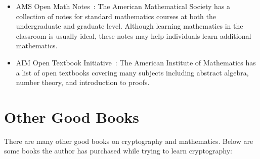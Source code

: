 \begin{itemize}
\item AMS Open Math Notes~\cite{AMSOpenMathNotes}:
    The American Mathematical Society has a collection of notes
    for standard mathematics courses at both the undergraduate
    and graduate level.
    Although learning mathematics in the classroom is usually ideal,
    these notes may help individuals learn additional
    mathematics.
\item AIM Open Textbook Initiative~\cite{AIMTextbooks}:
    The American Institute of Mathematics has a list of open textbooks
    covering many subjects including abstract algebra, \gls{number theory},
    and introduction to proofs.
\end{itemize}



\section{Other Good Books}

There are many other good books on cryptography and mathematics.
Below are some books the author has purchased while trying
to learn cryptography:

